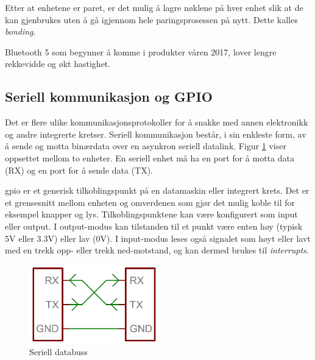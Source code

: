Etter at enhetene er paret, er det mulig å lagre nøklene på hver enhet slik at de kan gjenbrukes uten å gå igjennom hele
paringsprosessen på nytt. Dette kalles \textit{bonding}.

Bluetooth 5 som begynner å komme i produkter våren 2017, lover lengre rekkevidde og økt hastighet.


\subsection{Seriell kommunikasjon og GPIO}
Det er flere ulike kommunikasjonsprotokoller for å snakke med annen elektronikk og andre integrerte kretser.
Seriell kommunikasjon består, i sin enkleste form, av å sende og motta binærdata over en asynkron seriell datalink.
Figur \ref{fig:serial} viser oppsettet mellom to enheter. En seriell enhet må ha en port for å motta data (RX)
og en port for å sende data (TX).

\Gls{gpio} er et generisk tilkoblingspunkt på en datamaskin eller integrert krets. Det er et grensesnitt mellom enheten
og omverdenen som gjør det mulig koble til for eksempel knapper og lys. Tilkoblingspunktene kan være konfigurert som
input eller output. I output-modus kan tilstanden til et punkt være enten høy (typisk 5V eller 3.3V) eller lav (0V).
I input-modus leses også signalet som høyt eller lavt med en trekk opp- eller trekk ned-motstand, og kan dermed
brukes til \textit{interrupts}.

\begin{figure}
\includegraphics[width=0.5\textwidth,center]{fig/serial}
\caption{Seriell databuss}
\label{fig:serial}
\end{figure}

